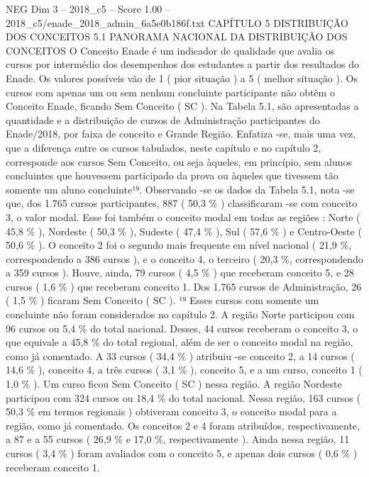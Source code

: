 \begin{textsample}{NEG Dim 3 – 2018\_c5 – Score 1.00 – 2018\_c5/enade\_2018\_admin\_6a5e0b186f.txt}  \label{ex:f3_neg_099}
CAPÍTULO 5 DISTRIBUIÇÃO DOS CONCEITOS 5.1 PANORAMA NACIONAL DA DISTRIBUIÇÃO DOS CONCEITOS O Conceito Enade é um indicador de qualidade que avalia os cursos por intermédio dos desempenhos dos estudantes a partir dos resultados do Enade.
Os valores possíveis vão de 1 ( pior situação ) a 5 ( melhor situação ).
Os cursos com apenas um ou sem nenhum concluinte participante não obtêm o Conceito Enade, ficando Sem Conceito ( SC ).
Na Tabela 5.1, são apresentadas a quantidade e a distribuição de cursos de Administração participantes do Enade/2018, por faixa de conceito e Grande Região.
Enfatiza -se, mais uma vez, que a diferença entre os cursos tabulados, neste capítulo e no capítulo 2, corresponde aos cursos Sem Conceito, ou seja àqueles, em princípio, sem alunos concluintes que houvessem participado da prova ou àqueles que tivessem tão somente um aluno concluinte¹⁹.
Observando -se os dados da Tabela 5.1, nota -se que, dos 1.765 cursos participantes, 887 ( 50,3 \% ) classificaram -se com conceito 3, o valor modal.
Esse foi também o conceito modal em todas as regiões : Norte ( 45,8 \% ), Nordeste ( 50,3 \% ), Sudeste ( 47,4 \% ), Sul ( 57,6 \% ) e Centro-Oeste ( 50,6 \% ).
O conceito 2 foi o segundo mais frequente em nível nacional ( 21,9 \%, correspondendo a 386 cursos ), e o conceito 4, o terceiro ( 20,3 \%, correspondendo a 359 cursos ).
Houve, ainda, 79 cursos ( 4,5 \% ) que receberam conceito 5, e 28 cursos ( 1,6 \% ) que receberam conceito 1.
Dos 1.765 cursos de Administração, 26 ( 1,5 \% ) ficaram Sem Conceito ( SC ). ¹⁹ Esses cursos com somente um concluinte não foram considerados no capítulo 2.
A região Norte participou com 96 cursos ou 5,4 \% do total nacional.
Desses, 44 cursos receberam o conceito 3, o que equivale a 45,8 \% do total regional, além de ser o conceito modal na região, como já comentado.
A 33 cursos ( 34,4 \% ) atribuiu -se conceito 2, a 14 cursos ( 14,6 \% ), conceito 4, a três cursos ( 3,1 \% ), conceito 5, e a um curso, conceito 1 ( 1,0 \% ).
Um curso ficou Sem Conceito ( SC ) nessa região.
A região Nordeste participou com 324 cursos ou 18,4 \% do total nacional.
Nessa região, 163 cursos ( 50,3 \% em termos regionais ) obtiveram conceito 3, o conceito modal para a região, como já comentado.
Os conceitos 2 e 4 foram atribuídos, respectivamente, a 87 e a 55 cursos ( 26,9 \% e 17,0 \%, respectivamente ).
Ainda nessa região, 11 cursos ( 3,4 \% ) foram avaliados com o conceito 5, e apenas dois cursos ( 0,6 \% ) receberam conceito 1.

\end{textsample}

